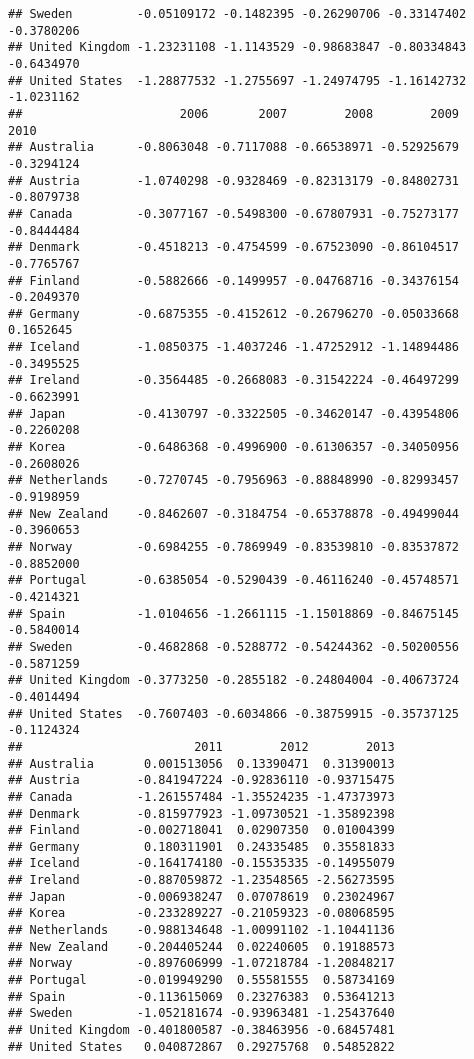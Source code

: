 \documentclass[
]{article}
\begin{document}
\begin{verbatim}
## Sweden         -0.05109172 -0.1482395 -0.26290706 -0.33147402 -0.3780206
## United Kingdom -1.23231108 -1.1143529 -0.98683847 -0.80334843 -0.6434970
## United States  -1.28877532 -1.2755697 -1.24974795 -1.16142732 -1.0231162
##                      2006       2007        2008        2009       2010
## Australia      -0.8063048 -0.7117088 -0.66538971 -0.52925679 -0.3294124
## Austria        -1.0740298 -0.9328469 -0.82313179 -0.84802731 -0.8079738
## Canada         -0.3077167 -0.5498300 -0.67807931 -0.75273177 -0.8444484
## Denmark        -0.4518213 -0.4754599 -0.67523090 -0.86104517 -0.7765767
## Finland        -0.5882666 -0.1499957 -0.04768716 -0.34376154 -0.2049370
## Germany        -0.6875355 -0.4152612 -0.26796270 -0.05033668  0.1652645
## Iceland        -1.0850375 -1.4037246 -1.47252912 -1.14894486 -0.3495525
## Ireland        -0.3564485 -0.2668083 -0.31542224 -0.46497299 -0.6623991
## Japan          -0.4130797 -0.3322505 -0.34620147 -0.43954806 -0.2260208
## Korea          -0.6486368 -0.4996900 -0.61306357 -0.34050956 -0.2608026
## Netherlands    -0.7270745 -0.7956963 -0.88848990 -0.82993457 -0.9198959
## New Zealand    -0.8462607 -0.3184754 -0.65378878 -0.49499044 -0.3960653
## Norway         -0.6984255 -0.7869949 -0.83539810 -0.83537872 -0.8852000
## Portugal       -0.6385054 -0.5290439 -0.46116240 -0.45748571 -0.4214321
## Spain          -1.0104656 -1.2661115 -1.15018869 -0.84675145 -0.5840014
## Sweden         -0.4682868 -0.5288772 -0.54244362 -0.50200556 -0.5871259
## United Kingdom -0.3773250 -0.2855182 -0.24804004 -0.40673724 -0.4014494
## United States  -0.7607403 -0.6034866 -0.38759915 -0.35737125 -0.1124324
##                        2011        2012        2013
## Australia       0.001513056  0.13390471  0.31390013
## Austria        -0.841947224 -0.92836110 -0.93715475
## Canada         -1.261557484 -1.35524235 -1.47373973
## Denmark        -0.815977923 -1.09730521 -1.35892398
## Finland        -0.002718041  0.02907350  0.01004399
## Germany         0.180311901  0.24335485  0.35581833
## Iceland        -0.164174180 -0.15535335 -0.14955079
## Ireland        -0.887059872 -1.23548565 -2.56273595
## Japan          -0.006938247  0.07078619  0.23024967
## Korea          -0.233289227 -0.21059323 -0.08068595
## Netherlands    -0.988134648 -1.00991102 -1.10441136
## New Zealand    -0.204405244  0.02240605  0.19188573
## Norway         -0.897606999 -1.07218784 -1.20848217
## Portugal       -0.019949290  0.55581555  0.58734169
## Spain          -0.113615069  0.23276383  0.53641213
## Sweden         -1.052181674 -0.93963481 -1.25437640
## United Kingdom -0.401800587 -0.38463956 -0.68457481
## United States   0.040872867  0.29275768  0.54852822
\end{verbatim}
\end{document}
